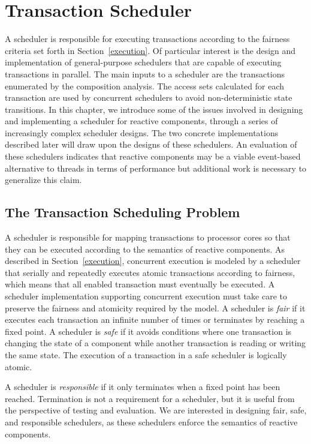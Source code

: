 \chapter{Transaction Scheduler}
\label{scheduler}

A scheduler is responsible for executing transactions according to the fairness criteria set forth in Section~\ref{execution}.
Of particular interest is the design and implementation of general-purpose schedulers that are capable of executing transactions in parallel.
The main inputs to a scheduler are the transactions enumerated by the composition analysis.
The access sets calculated for each transaction are used by concurrent schedulers to avoid non-deterministic state transitions.
In this chapter, we introduce some of the issues involved in designing and implementing a scheduler for reactive components, through a series of increasingly complex scheduler designs.
The two concrete implementations described later will draw upon the designs of these schedulers.
An evaluation of these schedulers indicates that reactive components may be a viable event-based alternative to threads in terms of performance but additional work is necessary to generalize this claim.

\section{The Transaction Scheduling Problem}
\label{scheduling_problem}

A scheduler is responsible for mapping transactions to processor cores so that they can be executed according to the semantics of reactive components.
As described in Section~\ref{execution}, concurrent execution is modeled by a scheduler that serially and repeatedly executes atomic transactions according to fairness, which means that all enabled transaction must eventually be executed.
A scheduler implementation supporting concurrent execution must take care to preserve the fairness and atomicity required by the model.
A scheduler is \emph{fair} if it executes each transaction an infinite number of times or terminates by reaching a fixed point.
A scheduler is \emph{safe} if it avoids conditions where one transaction is changing the state of a component while another transaction is reading or writing the same state.
The execution of a transaction in a safe scheduler is logically atomic.

A scheduler is \emph{responsible} if it only terminates when a fixed point has been reached.
Termination is not a requirement for a scheduler, but it is useful from the perspective of testing and evaluation.
We are interested in designing fair, safe, and responsible schedulers, as these schedulers enforce the semantics of reactive components.

